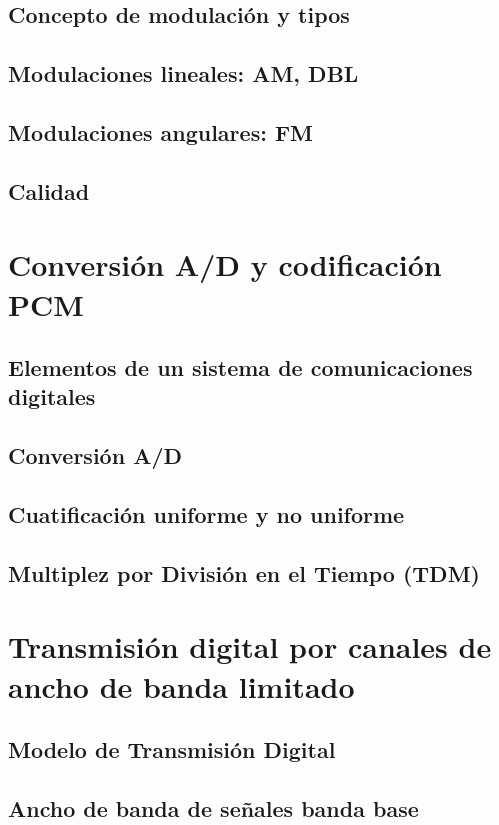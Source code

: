 \documentclass[a4paper]{book}
\begin{document}
\section{Concepto de modulación y tipos}
\section{Modulaciones lineales: AM, DBL}
\section{Modulaciones angulares: FM}
\section{Calidad}

\chapter{Conversión A/D y codificación PCM}
\section{\texorpdfstring{Elementos de un sistema de comunicaciones\\ digitales}{Elementos de un sistema de comunicaciones digitales}}
\section{Conversión A/D}
\section{Cuatificación uniforme y no uniforme}
\section{Multiplez por División en el Tiempo (TDM)}

\chapter{Transmisión digital por canales de ancho de banda limitado}
\section{Modelo de Transmisión Digital}
\section{Ancho de banda de señales banda base}
\end{document}
